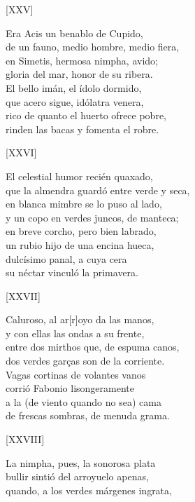\documentclass[11pt,a4paper,twoside]{article}
\begin{document}
\begin{center}
	[XXV]
\end{center}\pstart
Era Acis un benablo de Cupido,\\
de un fauno, medio hombre, medio fiera,\\
en Simetis, hermosa nimpha, avido;\\
gloria del mar, honor de su ribera.\\
El bello imán, el ídolo dormido,\\
que acero sigue, idólatra venera,\\
rico de quanto el huerto ofrece pobre,\\
rinden las bacas y fomenta el robre.\par\pend
%
\begin{center}
	[XXVI]
\end{center}\pstart
El celestial humor recién quaxado,\\
que la almendra guardó entre verde y seca,\\
en blanca mimbre se lo puso al lado,\\
y un copo en verdes juncos, de manteca;\\
en breve corcho, pero bien labrado,\\
un rubio hijo de una encina hueca,\\
dulcísimo panal, a cuya cera\\
su néctar vinculó la primavera.\par\pend
%
\begin{center}
	[XXVII]
\end{center}\pstart
Caluroso, al ar[r]oyo da las manos,\\
y con ellas las ondas a su frente,\\
entre dos mirthos que, de espuma canos,\\
dos verdes garças son de la corriente.\\
Vagas cortinas de volantes vanos\\
corrió Fabonio lisongeramente\\
a la (de viento quando no sea) cama\\
de frescas sombras, de menuda grama.\par\pend
\newpage
%
\begin{center}
	[XXVIII]
\end{center}\pstart
La nimpha, pues, la sonorosa plata\\
bullir sintió del arroyuelo apenas,\\
quando, a los verdes márgenes ingrata,\\
\end{document}
